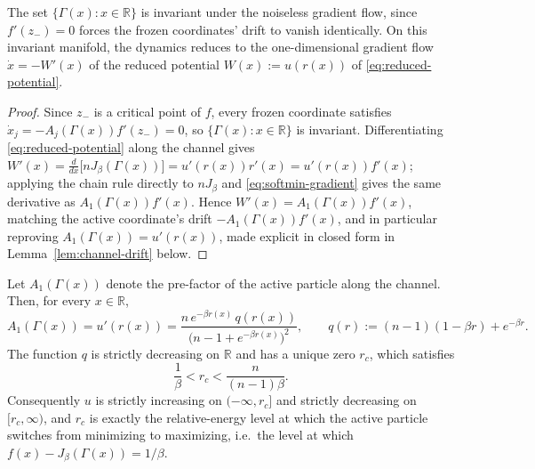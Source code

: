 \documentclass{opt2026} %
\newcommand{\prefactor}[2]{A_{#1}(#2)}
\newcommand{\R}{\mathbb{R}}
\begin{document}
\begin{lemma}
\label{lem:channel-invariant}
The set $\{\Gamma(x):x\in\R\}$ is invariant under the noiseless gradient flow, since $f'(z_-)=0$ forces the frozen coordinates' drift to vanish identically. On this invariant manifold, the dynamics reduces to the one-dimensional gradient flow $\dot x=-W'(x)$ of the reduced potential $W(x):=u(r(x))$ of \eqref{eq:reduced-potential}.
\end{lemma}

\begin{proof}
Since $z_-$ is a critical point of $f$, every frozen coordinate satisfies $\dot x_j=-\prefactor{j}{\Gamma(x)}f'(z_-)=0$, so $\{\Gamma(x):x\in\R\}$ is invariant. Differentiating \eqref{eq:reduced-potential} along the channel gives $W'(x)=\frac{d}{dx}\bigl[nJ_\beta(\Gamma(x))\bigr]=u'(r(x))r'(x)=u'(r(x))f'(x)$; applying the chain rule directly to $nJ_\beta$ and \eqref{eq:softmin-gradient} gives the same derivative as $\prefactor{1}{\Gamma(x)}f'(x)$. Hence $W'(x)=\prefactor{1}{\Gamma(x)}f'(x)$, matching the active coordinate's drift $-\prefactor{1}{\Gamma(x)}f'(x)$, and in particular reproving $\prefactor{1}{\Gamma(x)}=u'(r(x))$, made explicit in closed form in Lemma~\ref{lem:channel-drift} below.
\end{proof}

\begin{lemma}
\label{lem:channel-drift}
Let $\prefactor{1}{\Gamma(x)}$ denote the pre-factor of the active particle along the channel. Then, for every $x\in\R$,
\begin{equation}
    \prefactor{1}{\Gamma(x)}=u'(r(x))
    =\frac{n\,e^{-\beta r(x)}\,q(r(x))}{\bigl(n-1+e^{-\beta r(x)}\bigr)^{2}},
    \qquad
    q(r):=(n-1)(1-\beta r)+e^{-\beta r}.
    \label{eq:a1-equals-uprime}
\end{equation}
The function $q$ is strictly decreasing on $\R$ and has a unique zero $r_c$, which satisfies
\begin{equation}
    \frac1\beta<r_c<\frac{n}{(n-1)\beta}.
    \label{eq:rc-location}
\end{equation}
Consequently $u$ is strictly increasing on $(-\infty,r_c]$ and strictly decreasing on $[r_c,\infty)$, and $r_c$ is exactly the relative-energy level at which the active particle switches from minimizing to maximizing, i.e.\ the level at which $f(x)-J_\beta(\Gamma(x))=1/\beta$.
\end{lemma}
\end{document}

